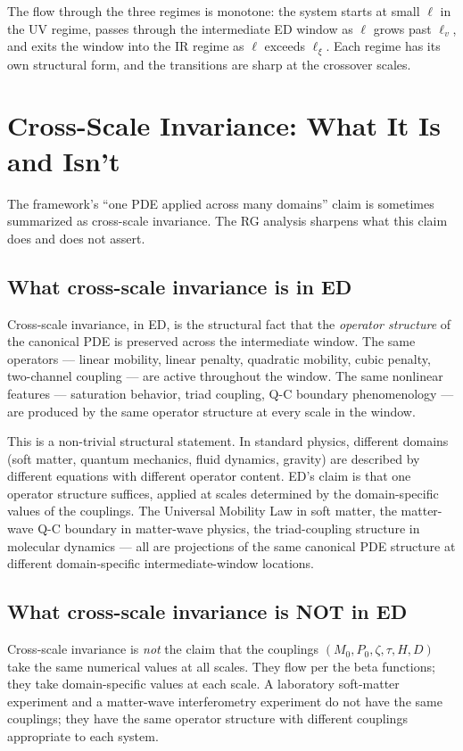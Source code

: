 \documentclass[11pt,a4paper]{article}
\begin{document}
The flow through the three regimes is monotone: the system starts at small $\ell$ in the UV regime, passes through the intermediate ED window as $\ell$ grows past $\ell_v$, and exits the window into the IR regime as $\ell$ exceeds $\ell_\xi$. Each regime has its own structural form, and the transitions are sharp at the crossover scales.

\section{Cross-Scale Invariance: What It Is and Isn't}

The framework's ``one PDE applied across many domains'' claim is sometimes summarized as cross-scale invariance. The RG analysis sharpens what this claim does and does not assert.

\subsection{What cross-scale invariance is in ED}

Cross-scale invariance, in ED, is the structural fact that the \emph{operator structure} of the canonical PDE is preserved across the intermediate window. The same operators --- linear mobility, linear penalty, quadratic mobility, cubic penalty, two-channel coupling --- are active throughout the window. The same nonlinear features --- saturation behavior, triad coupling, Q-C boundary phenomenology --- are produced by the same operator structure at every scale in the window.

This is a non-trivial structural statement. In standard physics, different domains (soft matter, quantum mechanics, fluid dynamics, gravity) are described by different equations with different operator content. ED's claim is that one operator structure suffices, applied at scales determined by the domain-specific values of the couplings. The Universal Mobility Law in soft matter, the matter-wave Q-C boundary in matter-wave physics, the triad-coupling structure in molecular dynamics --- all are projections of the same canonical PDE structure at different domain-specific intermediate-window locations.

\subsection{What cross-scale invariance is NOT in ED}

Cross-scale invariance is \emph{not} the claim that the couplings $(M_0, P_0, \zeta, \tau, H, D)$ take the same numerical values at all scales. They flow per the beta functions; they take domain-specific values at each scale. A laboratory soft-matter experiment and a matter-wave interferometry experiment do not have the same couplings; they have the same operator structure with different couplings appropriate to each system.
\end{document}
